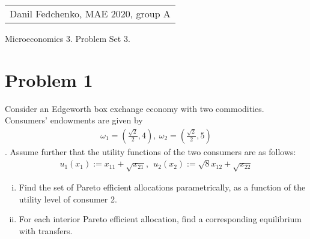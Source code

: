 \documentclass[a4paper]{article}
\begin{document}
	\begin{flushright}
	\begin{tabular}{r}
		Danil Fedchenko, MAE 2020, group A \\
	\end{tabular}
\end{flushright}


\begin{center}
	Microeconomics 3. Problem Set 3.
\end{center}
\section*{Problem 1}
Consider an Edgeworth box exchange economy with two commodities. Consumers'
endowments are given by 
\begin{align*}
\omega_1 = (\frac{\sqrt{2}}{2}, 4),\ \omega_2 = (\frac{\sqrt{2}}{2}, 5)
\end{align*}. 
Assume further that the utility
functions of the two consumers are as follows:
\begin{align*}
u_1(x_1) := x_{11} + \sqrt{x_{21}},\ \ 
u_2(x_2) := \sqrt{8}x_{12} + \sqrt{x_{22}}
\end{align*}
\begin{enumerate}[(i)]
\item Find the set of Pareto efficient allocations parametrically, as a function of the utility level
of consumer 2.
\item For each interior Pareto efficient allocation, find a corresponding equilibrium with transfers.

\end{enumerate}
\end{document}
